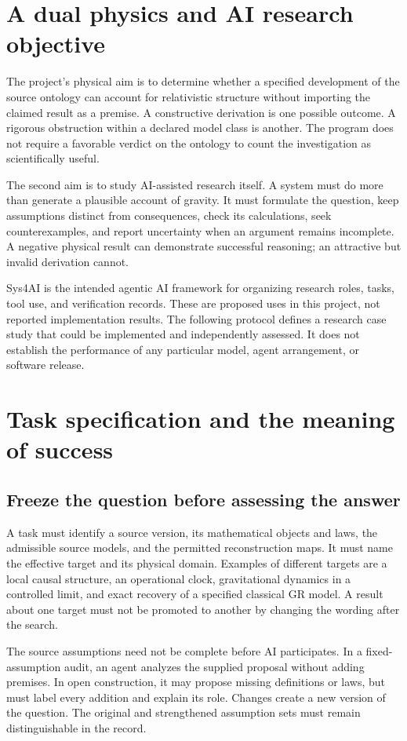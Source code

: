 \documentclass[11pt]{article}
\begin{document}
\section{A dual physics and AI research objective}
The project's physical aim is to determine whether a specified development of the source ontology can account for relativistic structure without importing the claimed result as a premise. A constructive derivation is one possible outcome. A rigorous obstruction within a declared model class is another. The program does not require a favorable verdict on the ontology to count the investigation as scientifically useful.

The second aim is to study AI-assisted research itself. A system must do more than generate a plausible account of gravity. It must formulate the question, keep assumptions distinct from consequences, check its calculations, seek counterexamples, and report uncertainty when an argument remains incomplete. A negative physical result can demonstrate successful reasoning; an attractive but invalid derivation cannot.

Sys4AI is the intended agentic AI framework for organizing research roles, tasks, tool use, and verification records. These are proposed uses in this project, not reported implementation results. The following protocol defines a research case study that could be implemented and independently assessed. It does not establish the performance of any particular model, agent arrangement, or software release.

\section{Task specification and the meaning of success}
\subsection{Freeze the question before assessing the answer}
A task must identify a source version, its mathematical objects and laws, the admissible source models, and the permitted reconstruction maps. It must name the effective target and its physical domain. Examples of different targets are a local causal structure, an operational clock, gravitational dynamics in a controlled limit, and exact recovery of a specified classical GR model. A result about one target must not be promoted to another by changing the wording after the search.

The source assumptions need not be complete before AI participates. In a fixed-assumption audit, an agent analyzes the supplied proposal without adding premises. In open construction, it may propose missing definitions or laws, but must label every addition and explain its role. Changes create a new version of the question. The original and strengthened assumption sets must remain distinguishable in the record.
\end{document}
